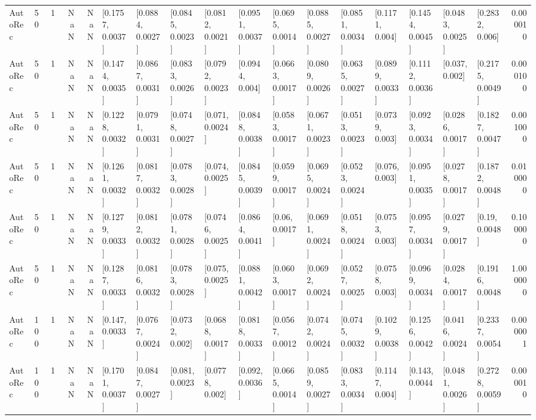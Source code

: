 \begin{tabular}{lllrrllllllllllllr}
 AutoRec &   50 &     1 &   NaN &   NaN &  [0.1757, 0.0037] &  [0.0884, 0.0027] &  [0.0845, 0.0023] &  [0.0812, 0.0021] &  [0.0951, 0.0037] &  [0.0695, 0.0014] &  [0.0885, 0.0027] &  [0.0851, 0.0034] &   [0.1171, 0.004] &  [0.1454, 0.0045] &  [0.0483, 0.0025] &   [0.2832, 0.006] &  0.000010 \\
 AutoRec &   50 &     1 &   NaN &   NaN &  [0.1474, 0.0035] &  [0.0867, 0.0031] &  [0.0833, 0.0026] &  [0.0792, 0.0023] &   [0.0944, 0.004] &  [0.0663, 0.0017] &  [0.0809, 0.0026] &  [0.0635, 0.0027] &  [0.0899, 0.0033] &  [0.1112, 0.0036] &    [0.037, 0.002] &  [0.2175, 0.0049] &  0.000100 \\
 AutoRec &   50 &     1 &   NaN &   NaN &  [0.1228, 0.0032] &  [0.0791, 0.0031] &  [0.0748, 0.0027] &   [0.071, 0.0024] &  [0.0848, 0.0038] &  [0.0583, 0.0017] &  [0.0671, 0.0023] &  [0.0513, 0.0023] &   [0.0739, 0.003] &  [0.0923, 0.0034] &  [0.0286, 0.0017] &  [0.1827, 0.0047] &  0.001000 \\
 AutoRec &   50 &     1 &   NaN &   NaN &  [0.1261, 0.0032] &  [0.0817, 0.0032] &  [0.0783, 0.0028] &   [0.074, 0.0025] &  [0.0845, 0.0039] &  [0.0599, 0.0017] &  [0.0695, 0.0024] &  [0.0523, 0.0024] &    [0.076, 0.003] &  [0.0951, 0.0035] &  [0.0278, 0.0017] &  [0.1872, 0.0048] &  0.010000 \\
 AutoRec &   50 &     1 &   NaN &   NaN &  [0.1279, 0.0033] &  [0.0812, 0.0032] &  [0.0781, 0.0028] &  [0.0746, 0.0025] &  [0.0864, 0.0041] &    [0.06, 0.0017] &  [0.0691, 0.0024] &  [0.0518, 0.0024] &   [0.0753, 0.003] &  [0.0957, 0.0034] &  [0.0279, 0.0017] &    [0.19, 0.0048] &  0.100000 \\
 AutoRec &   50 &     1 &   NaN &   NaN &  [0.1287, 0.0033] &  [0.0816, 0.0032] &  [0.0783, 0.0028] &   [0.075, 0.0025] &  [0.0881, 0.0042] &  [0.0603, 0.0017] &  [0.0692, 0.0024] &  [0.0527, 0.0025] &   [0.0758, 0.003] &  [0.0969, 0.0034] &  [0.0284, 0.0017] &  [0.1916, 0.0048] &  1.000000 \\
 AutoRec &  100 &     1 &   NaN &   NaN &   [0.147, 0.0033] &  [0.0767, 0.0024] &   [0.0732, 0.002] &  [0.0688, 0.0017] &  [0.0818, 0.0033] &  [0.0567, 0.0012] &  [0.0742, 0.0024] &  [0.0745, 0.0032] &  [0.1029, 0.0038] &  [0.1256, 0.0042] &  [0.0416, 0.0024] &  [0.2337, 0.0054] &  0.000001 \\
 AutoRec &  100 &     1 &   NaN &   NaN &  [0.1701, 0.0037] &  [0.0847, 0.0027] &   [0.081, 0.0023] &   [0.0778, 0.002] &   [0.092, 0.0036] &  [0.0665, 0.0014] &  [0.0859, 0.0027] &  [0.0833, 0.0034] &   [0.1147, 0.004] &   [0.143, 0.0044] &  [0.0481, 0.0026] &  [0.2728, 0.0059] &  0.000010 \\

\end{tabular}
